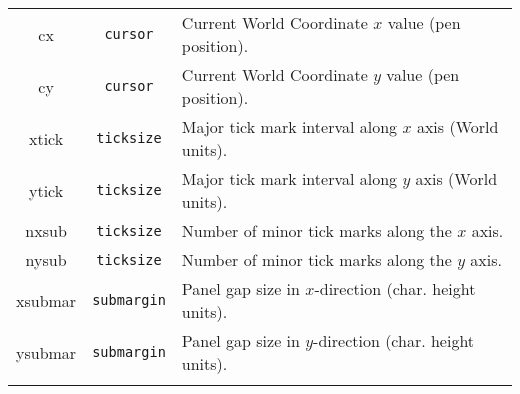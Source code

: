 \begin{table}
\begin{tabular}{|c|c|p{\tabentrylen}|}
    cx     & {\tt cursor} & Current World Coordinate $x$ value (pen position).\\
    cy     & {\tt cursor} & Current World Coordinate $y$ value (pen position).\\
    xtick  & {\tt ticksize}
           & Major tick mark interval along $x$ axis (World units). \\
    ytick  & {\tt ticksize}
           & Major tick mark interval along $y$ axis (World units). \\
    nxsub  & {\tt ticksize} & Number of minor tick marks along the $x$ axis. \\
    nysub  & {\tt ticksize} & Number of minor tick marks along the $y$ axis. \\
    xsubmar & {\tt submargin}
           & Panel gap size in $x$-direction (char. height units). \\
    ysubmar & {\tt submargin}
           & Panel gap size in $y$-direction (char. height units). \\
    && \\ \hline\hline
  \end{tabular}
\end{table}

